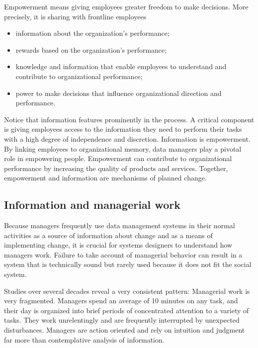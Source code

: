 \documentclass[
]{article}
\begin{document}
Empowerment means giving employees greater freedom to make decisions.
More precisely, it is sharing with frontline employees

\begin{itemize}
\item
  information about the organization's performance;
\item
  rewards based on the organization's performance;
\item
  knowledge and information that enable employees to understand and
  contribute to organizational performance;
\item
  power to make decisions that influence organizational direction and
  performance.
\end{itemize}

Notice that information features prominently in the process. A critical
component is giving employees access to the information they need to
perform their tasks with a high degree of independence and discretion.
Information is empowerment. By linking employees to organizational
memory, data managers play a pivotal role in empowering people.
Empowerment can contribute to organizational performance by increasing
the quality of products and services. Together, empowerment and
information are mechanisms of planned change.

\hypertarget{information-and-managerial-work}{%
\subsection*{Information and managerial work}\label{information-and-managerial-work}}

Because managers frequently use data management systems in their normal
activities as a source of information about change and as a means of
implementing change, it is crucial for systems designers to understand
how managers work. Failure to take account of managerial behavior can
result in a system that is technically sound but rarely used because it
does not fit the social system.

Studies over several decades reveal a very consistent pattern:
Managerial work is very fragmented. Managers spend an average of 10
minutes on any task, and their day is organized into brief periods of
concentrated attention to a variety of tasks. They work unrelentingly
and are frequently interrupted by unexpected disturbances. Managers are
action oriented and rely on intuition and judgment far more than
contemplative analysis of information.
\end{document}
